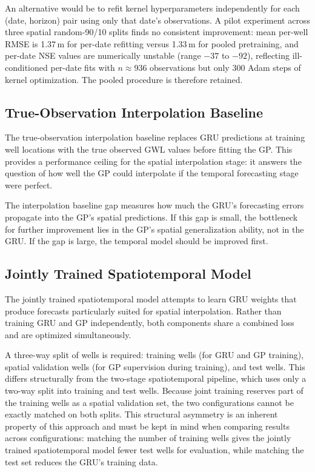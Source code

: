 An alternative would be to refit kernel hyperparameters independently for each (date, horizon) pair using only that date's observations. A pilot experiment across three spatial random-90/10 splits finds no consistent improvement: mean per-well RMSE is 1.37\,m for per-date refitting versus 1.33\,m for pooled pretraining, and per-date NSE values are numerically unstable (range $-37$ to $-92$), reflecting ill-conditioned per-date fits with $n \approx 936$ observations but only 300 Adam steps of kernel optimization. The pooled procedure is therefore retained.

\subsection{True-Observation Interpolation Baseline}
\label{sec:interp_baseline}

The true-observation interpolation baseline replaces GRU predictions at training well locations with the true observed
GWL values before fitting the GP. This provides a performance ceiling for the spatial
interpolation stage: it answers the question of how well the GP could interpolate if
the temporal forecasting stage were perfect.

The interpolation baseline gap measures how much the GRU's forecasting
errors propagate into the GP's spatial predictions. If this gap is small, the bottleneck for
further improvement lies in the GP's spatial generalization ability, not in the GRU. If the
gap is large, the temporal model should be improved first.

\subsection{Jointly Trained Spatiotemporal Model}
\label{sec:joint_design}

The jointly trained spatiotemporal model attempts to learn GRU weights that produce forecasts particularly
suited for spatial interpolation. Rather than training GRU and GP independently, both components
share a combined loss and are optimized simultaneously.

A three-way split of wells is required: training wells (for GRU and GP training), spatial
validation wells (for GP supervision during training), and test wells.
This differs structurally from the two-stage spatiotemporal pipeline, which uses only a two-way split into
training and test wells. Because joint training reserves part of the training wells as a spatial validation set,
the two configurations cannot be exactly matched on both splits. This structural
asymmetry is an inherent property of this approach and must be kept in mind when
comparing results across configurations: matching the number of training wells gives the jointly trained spatiotemporal model
fewer test wells for evaluation, while matching the test set reduces the GRU's training
data.

